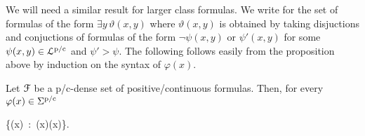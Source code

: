 \documentclass[10pt,oneside]{amsproc}
\newcommand{\mylabel}[1]{{#1}\hfill}
\renewenvironment{itemize}
  {\begin{list}{$\triangleright$}{%
  \setlength{\parskip}{0mm}
  \setlength{\topsep}{.4\baselineskip}
  \setlength{\rightmargin}{0mm}
  \setlength{\listparindent}{0mm}
  \setlength{\itemindent}{0mm}
  \setlength{\labelwidth}{3ex}
  \setlength{\itemsep}{.2\baselineskip}
  \setlength{\parsep}{.2\baselineskip}
  \setlength{\partopsep}{0mm}
  \setlength{\labelsep}{1ex}
  \setlength{\leftmargin}{\labelwidth+\labelsep}
  \let\makelabel\mylabel}}{%
\end{list}}
\renewcommand*{\emph}[1]{%
   \smash{\tikz[baseline]\node[rectangle, fill=teal!25, rounded corners, inner xsep=0.5ex, inner ysep=0.2ex, anchor=base, minimum height = 2.7ex]{\strut #1};}}
\begin{document}
{We will need a similar result for larger class formulas.
We write \emph{$\Sigma^{\rm p/c}$\/} for the set of formulas of the form $\exists y\,\vartheta(x,y)$ where $\vartheta(x,y)$ is obtained by taking disjuctions and conjuctions of formulas of the form $\neg\psi(x,y)$ or $\psi'(x,y)$ for some $\psi(x,y)\in{\EuScript L}^{\rm p/c}$ and $\psi'>\psi$.
The following follows easily from the proposition above by induction on the syntax of $\varphi(x)$.

\begin{proposition}\label{prop_Sigma_approx}
  Let ${\EuScript F}$ be a p/c-dense set of positive/continuous formulas.
  Then, for every $\varphi(x)\in\Sigma^{\rm p/c}$
  
  {\leftrightarrow}
  {\bigvee\big\{\psi(x)\ :\ \psi(x)\rightarrow\varphi(x)\big\}.}
\end{proposition}




 





}
\end{document}
